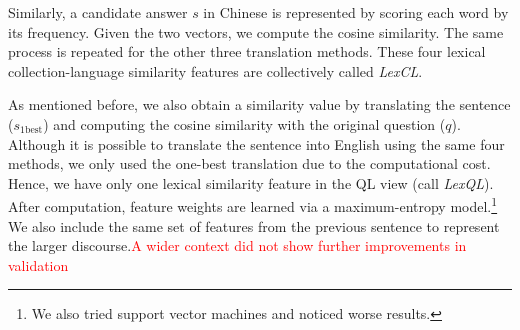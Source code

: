 \documentclass{sig-alternate-05-2015}
\newcommand{\red}[1]{\textcolor{red}{#1}}
\begin{document}
Similarly, a candidate answer $s$ in Chinese is represented by scoring each word by its frequency. Given the two vectors, 
we compute the cosine similarity.
The same process is repeated for the 
other three translation methods. These four lexical collection-language similarity features are collectively called \emph{LexCL}.


As mentioned before, we also obtain a similarity value by translating the sentence ($s_{\textrm{1best}}$) 
and computing the cosine similarity with the original question ($q$). Although it is possible to translate the 
sentence into English using the same four methods, we only used the one-best translation due to the computational 
cost. Hence, we have only one lexical similarity feature in the QL view (call \emph{LexQL}).
After computation, feature weights are learned via a maximum-entropy model.\footnote{We also 
tried support vector machines and noticed worse results.} We also include the 
same set of features from the previous sentence to represent the larger discourse.\red{A wider context did not
show further improvements in validation}

\end{document}
